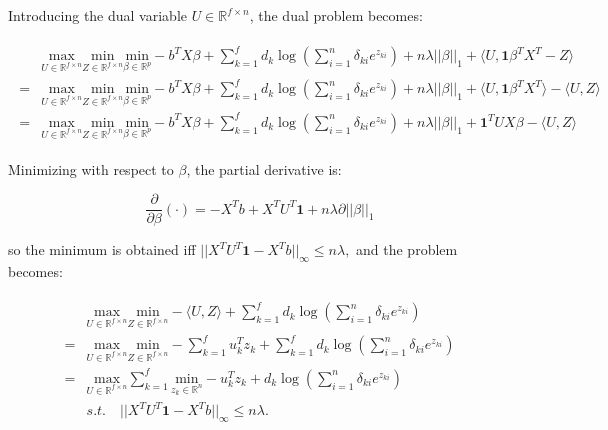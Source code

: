 Introducing the dual variable $U\in\mathbb{R}^{f\times n}$, the dual problem becomes:

\begin{gather}
    \label{eq:dual+u}
    \begin{aligned}
        &\underset{U\in \mathbb{R}^{f\times n}}{\mathrm{max}}\underset{Z\in \mathbb{R}^{f\times n}}{\mathrm{min}}\underset{\beta\in \mathbb{R}^p}{\mathrm{min}}-b^TX\beta+\sum_{k=1}^f d_k\log\left(\sum_{i=1}^n \delta_{ki} e^{z_{ki}}\right)+n\lambda||\beta||_1+\langle U,\mathbf{1}\beta^TX^T-Z\rangle\\
        =&\underset{U\in \mathbb{R}^{f\times n}}{\mathrm{max}}\underset{Z\in \mathbb{R}^{f\times n}}{\mathrm{min}}\underset{\beta\in \mathbb{R}^p}{\mathrm{min}}-b^TX\beta+\sum_{k=1}^f d_k\log\left(\sum_{i=1}^n \delta_{ki} e^{z_{ki}}\right)+n\lambda||\beta||_1+\langle U,\mathbf{1}\beta^TX^T\rangle-\langle U,Z\rangle\\
        =&\underset{U\in \mathbb{R}^{f\times n}}{\mathrm{max}}\underset{Z\in \mathbb{R}^{f\times n}}{\mathrm{min}}\underset{\beta\in \mathbb{R}^p}{\mathrm{min}}-b^TX\beta+\sum_{k=1}^f d_k\log\left(\sum_{i=1}^n \delta_{ki} e^{z_{ki}}\right)+n\lambda||\beta||_1+\mathbf{1}^TUX\beta-\langle U,Z\rangle
    \end{aligned}    
\end{gather}


Minimizing with respect to $\beta$, the partial derivative is:

\begin{equation}
    \label{eq:partialbeta}
    \frac{\partial}{\partial\beta}(\cdot) =-X^Tb+X^TU^T\mathbf{1}+n\lambda\partial||\beta||_1
\end{equation}

so the minimum is obtained iff $
    ||X^TU^T\mathbf{1}-X^Tb||_\infty\leq n\lambda,$ and the problem becomes:

\begin{gather}
    \label{eq:dual-beta}
    \begin{aligned}
        &\underset{U\in \mathbb{R}^{f\times n}}{\mathrm{max}}\underset{Z\in \mathbb{R}^{f\times n}}{\mathrm{min}}- \langle U,Z\rangle+\sum_{k=1}^f d_k\log\left(\sum_{i=1}^n \delta_{ki} e^{z_{ki}}\right)\\
        =&\underset{U\in \mathbb{R}^{f\times n}}{\mathrm{max}}\underset{Z\in \mathbb{R}^{f\times n}}{\mathrm{min}}-\sum_{k=1}^f u_k^Tz_k +\sum_{k=1}^f d_k\log\left(\sum_{i=1}^n \delta_{ki} e^{z_{ki}}\right)\\
        =&\underset{U\in \mathbb{R}^{f\times n}}{\mathrm{max}}\sum_{k=1}^f\underset{z_k\in \mathbb{R}^n}{\mathrm{min}}-u_k^Tz_k+d_k\log\left(\sum_{i=1}^n \delta_{ki} e^{z_{ki}}\right)\\
        &s.t.\quad ||X^TU^T\mathbf{1}-X^Tb||_\infty\leq n\lambda.
    \end{aligned}
\end{gather}

